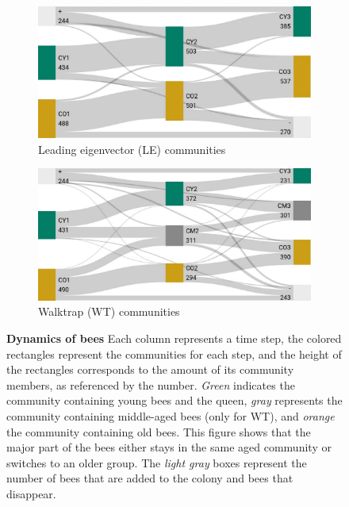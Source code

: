 \begin{figure}[htbp]
	\centering
	\begin{subfigure}[b]{1\textwidth}
	\centering
	\includegraphics[width=1\textwidth]{Figures/LE_matching.pdf}
	\caption[Leading eigenvector (LE) communities]{Leading eigenvector (LE) communities}
	\label{fig:membersLE}
	\vspace*{10mm}
	\end{subfigure}
	\begin{subfigure}[b]{1\textwidth}
	\centering
	\includegraphics[width=1\textwidth]{Figures/WT_matching.pdf}
	\caption[Walktrap (WT) communities]{Walktrap (WT) communities}
	\label{fig:membersWT}
	\vspace*{5mm}
	\end{subfigure}
	\caption[Dynamics of bees]{\textbf{Dynamics of bees} 
	Each column represents a time step, the colored rectangles represent the communities for each step, and the height of the rectangles corresponds to the amount of its community members, as referenced by the number. \emph{Green} indicates the community containing young bees and the queen, \emph{gray} represents the community containing middle-aged bees (only for WT), and \emph{orange} the community containing old bees. This figure shows that the major part of the bees either stays in the same aged community or switches to an older group. The \emph{light gray} boxes represent the number of bees that are added to the colony and bees that disappear.}
	\label{fig:members}
\end{figure}
